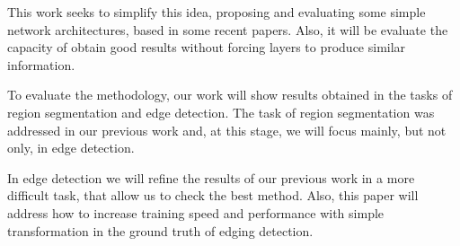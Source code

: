{\color{blue}
This work seeks to simplify this idea, proposing and evaluating some simple network architectures, based in some recent papers.
Also, it will be evaluate the capacity of obtain good results without forcing layers to produce similar information.

To evaluate the methodology, our work will show results obtained in the tasks of region segmentation and edge detection.
The task of region segmentation was addressed in our previous work \cite{Reis:2019} and, at this stage, we will focus mainly, but not only, in edge detection.
}

{\color{red}
In edge detection we will refine the results of our previous work in a more difficult task, that allow us to check the best method.
Also, this paper will address how to increase training speed and performance with simple transformation in the ground truth of edging detection.
}

